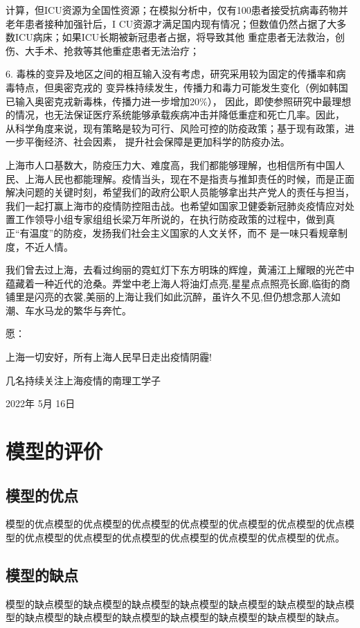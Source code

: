 \documentclass[bwprint]{gmcmthesis}
\numberwithin{figure}{section}
\begin{document}
计算，但ICU资源为全国性资源；在模拟分析中，仅有100患者接受抗病毒药物并老年患者接种加强针后，I
CU资源才满足国内现有情况；但数值仍然占据了大多数ICU病床；如果ICU长期被新冠患者占据，将导致其他
重症患者无法救治，创伤、大手术、抢救等其他重症患者无法治疗；
\par 6. 毒株的变异及地区之间的相互输入没有考虑，研究采用较为固定的传播率和病毒特点，但奥密克戎的
变异株持续发生，传播力和毒力可能发生变化（例如韩国已输入奥密克戎新毒株，传播力进一步增加20$\%$），
因此，即使参照研究中最理想的情况，也无法保证医疗系统能够承载疾病冲击并降低重症和死亡几率。因此，
从科学角度来说，现有策略是较为可行、风险可控的防疫政策；基于现有政策，进一步平衡经济、社会因素，
提升社会保障是更加科学的防疫办法。
\par 上海市人口基数大，防疫压力大、难度高，我们都能够理解，也相信所有中国人民、上海人民也都能理解。疫情当头，现在不是指责与推卸责任的时候，而是正面解决问题的关键时刻，希望我们的政府公职人员能够拿出共产党人的责任与担当，我们一起打赢上海市的疫情防控阻击战。也希望如国家卫健委新冠肺炎疫情应对处置工作领导小组专家组组长梁万年所说的，在执行防疫政策的过程中，做到真正“有温度”的防疫，发扬我们社会主义国家的人文关怀，而不
是一味只看规章制度，不近人情。
\par 我们曾去过上海，去看过绚丽的霓虹灯下东方明珠的辉煌，黄浦江上耀眼的光芒中蕴藏着一种近代的沧桑。弄堂中老上海人将油灯点亮,星星点点照亮长廊,临街的商铺里是闪亮的衣裳,美丽的上海让我们如此沉醉，虽许久不见,但仍想念那人流如潮、车水马龙的繁华与奔忙。
\\
\par 愿：
\begin{flushleft}
    上海一切安好，所有上海人民早日走出疫情阴霾!
\end{flushleft}
\begin{flushright}
    几名持续关注上海疫情的南理工学子
    \par 2022年 5月 16日
\end{flushright}



\section{模型的评价}
\subsection{模型的优点}
模型的优点模型的优点模型的优点模型的优点模型的优点模型的优点模型的优点模型的优点模型的优点模型的优点模型的优点模型的优点模型的优点模型的优点。
\subsection{模型的缺点}
模型的缺点模型的缺点模型的缺点模型的缺点模型的缺点模型的缺点模型的缺点模型的缺点模型的缺点模型的缺点模型的缺点模型的缺点模型的缺点模型的缺点。
\end{document}
